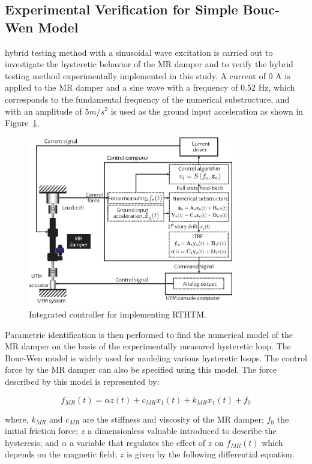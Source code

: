 \subsection{Experimental Verification for Simple Bouc-Wen Model}

hybrid testing method with a sinusoidal wave excitation is carried out to investigate the hysteretic behavior of the MR damper and to verify the hybrid testing method experimentally implemented in this study. A current of 0 A is applied to the MR damper and a sine wave with a frequency of 0.52 Hz, which corresponds to the fundamental frequency of the numerical substructure, and with an amplitude of $5m/s^{2}$ is used as the ground input acceleration as shown in Figure~\ref{fig:8-7}.

\begin{figure}[H]
\centering
\includegraphics[width=0.8\textwidth] {figure/8-7.eps}
\caption{Integrated controller for implementing RTHTM.}
\label{fig:8-7}
\end{figure}

Parametric identification is then performed to find the numerical model of the MR damper on the basis of the experimentally measured hysteretic loop. The Bouc-Wen model is widely used for modeling various hysteretic loops\citep{wen1976method}. The control force by the MR damper can also be specified using this model. The force described by this model is represented by:

\begin{equation}\label{eq:8-13}
f_{MR}(t) = \alpha z(t) + c_{MR}\dot{x}_{1}(t) + k_{MR}x_{1}(t) + f_{0}
\end{equation}

where, $k_{MR}$ and $c_{MR}$ are the stiffness and viscosity of the MR damper; $f_{0}$ the initial friction force; $z$ a dimensionless valuable introduced to describe the hysteresis; and $\alpha$ a variable that regulates the effect of $z$ on $f_{MR}(t)$ which depends on the magnetic field; $z$ is given by the following differential equation.

